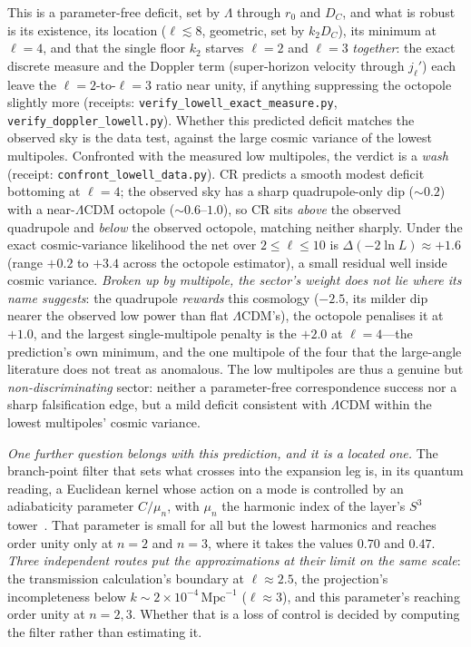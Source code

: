 \documentclass[11pt,a4paper]{article}
\theoremstyle{plain}
\theoremstyle{definition}
\theoremstyle{remark}
\begin{document}
This is a parameter-free deficit, set by $\Lambda$ through $r_0$ and $D_C$, and what is robust is its existence, its location ($\ell\lesssim8$, geometric, set by $k_2 D_C$), its minimum at $\ell=4$, and that the single floor $k_2$ starves $\ell=2$ and $\ell=3$ \emph{together}: the exact discrete measure and the Doppler term (super-horizon velocity through $j_\ell'$) each leave the $\ell=2$-to-$\ell=3$ ratio near unity, if anything suppressing the octopole slightly more (receipts: \texttt{verify\_lowell\_exact\_measure.py}, \texttt{verify\_doppler\_lowell.py}). Whether this predicted deficit matches the observed sky is the data test, against the large cosmic variance of the lowest multipoles. Confronted with the measured low multipoles, the verdict is a \emph{wash} (receipt: \texttt{confront\_lowell\_data.py}). CR predicts a smooth modest deficit bottoming at $\ell=4$; the observed sky has a sharp quadrupole-only dip ($\sim0.2$) with a near-$\Lambda$CDM octopole ($\sim0.6$--$1.0$), so CR sits \emph{above} the observed quadrupole and \emph{below} the observed octopole, matching neither sharply. Under the exact cosmic-variance likelihood the net over $2\le\ell\le10$ is $\Delta(-2\ln L)\approx+1.6$ (range $+0.2$ to $+3.4$ across the octopole estimator), a small residual well inside cosmic variance. \emph{Broken up by multipole, the sector's weight does not lie where its name suggests}: the quadrupole \emph{rewards} this cosmology ($-2.5$, its milder dip nearer the observed low power than flat $\Lambda$CDM's), the octopole penalises it at $+1.0$, and the largest single-multipole penalty is the $+2.0$ at $\ell=4$---the prediction's own minimum, and the one multipole of the four that the large-angle literature does not treat as anomalous. The low multipoles are thus a genuine but \emph{non-discriminating} sector: neither a parameter-free correspondence success nor a sharp falsification edge, but a mild deficit consistent with $\Lambda$CDM within the lowest multipoles' cosmic variance.

\emph{One further question belongs with this prediction, and it is a located one.}
The branch-point filter that sets what crosses into the expansion leg is, in its quantum reading, a Euclidean
kernel whose action on a mode is controlled by an adiabaticity parameter $C/\mu_{n}$, with $\mu_{n}$ the
harmonic index of the layer's $S^{3}$ tower~\cite{JanzenCanonicalTime}. That parameter is small for all but the
lowest harmonics and reaches order unity only at $n=2$ and $n=3$, where it takes the values $0.70$ and $0.47$.
\emph{Three independent routes put the approximations at their limit on the same scale}: the transmission
calculation's boundary at $\ell\approx2.5$, the projection's incompleteness below
$k\sim2\times10^{-4}\,\mathrm{Mpc}^{-1}$ ($\ell\approx3$), and this parameter's reaching order unity at $n=2,3$.
Whether that is a loss of control is decided by computing the filter rather than estimating it.
\end{document}
